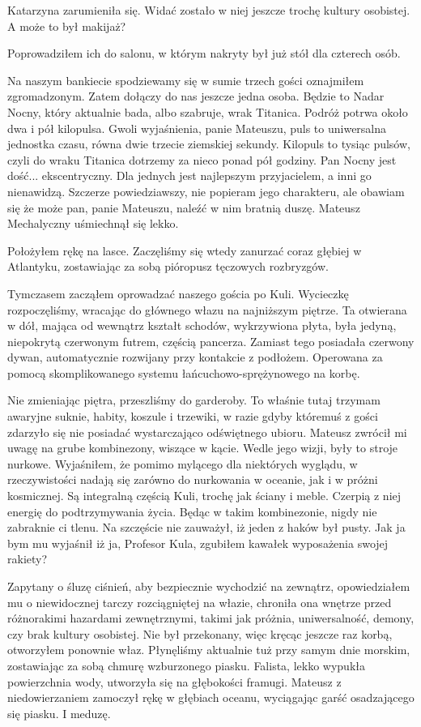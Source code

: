 Katarzyna zarumieniła się. Widać zostało w niej jeszcze trochę kultury osobistej. A może to był makijaż?

Poprowadziłem ich do salonu, w którym nakryty był już stół dla czterech osób.

\ds{} Na naszym bankiecie spodziewamy się w sumie trzech gości \dm{} oznajmiłem zgromadzonym. \dm{} Zatem dołączy do nas jeszcze jedna osoba.
Będzie to Nadar Nocny, który aktualnie bada, albo szabruje, wrak Titanica. Podróż potrwa około dwa i pół kilopulsa. 
Gwoli wyjaśnienia, panie Mateuszu, puls to uniwersalna jednostka czasu, równa dwie trzecie ziemskiej sekundy.
Kilopuls to tysiąc pulsów, czyli do wraku Titanica dotrzemy za nieco ponad pół godziny. 
Pan Nocny jest dość... ekscentryczny. Dla jednych jest najlepszym przyjacielem, a inni go nienawidzą.
Szczerze powiedziawszy, nie popieram jego charakteru, ale obawiam się że może pan, panie Mateuszu, naleźć w nim bratnią duszę.\dm{}
Mateusz Mechalyczny uśmiechnął się lekko. \de{}

Położyłem rękę na lasce.
Zaczęliśmy się wtedy zanurzać coraz głębiej w Atlantyku, zostawiając za sobą pióropusz tęczowych rozbryzgów.

Tymczasem zacząłem oprowadzać naszego gościa po Kuli.
Wycieczkę rozpoczęliśmy, wracając do głównego włazu na najniższym piętrze.
Ta otwierana w dół, mająca od wewnątrz kształt schodów, wykrzywiona płyta, była jedyną, niepokrytą czerwonym futrem, częścią pancerza.
Zamiast tego posiadała czerwony dywan, automatycznie rozwijany przy kontakcie z podłożem.
Operowana za pomocą skomplikowanego systemu łańcuchowo-sprężynowego na korbę.

Nie zmieniając piętra, przeszliśmy do garderoby.
To właśnie tutaj trzymam awaryjne suknie, habity, koszule i trzewiki, w razie gdyby któremuś z gości zdarzyło się nie posiadać wystarczająco odświętnego ubioru.
Mateusz zwrócił mi uwagę na grube kombinezony, wiszące w kącie. Wedle jego wizji, były to stroje nurkowe.
Wyjaśniłem, że pomimo mylącego dla niektórych wyglądu, w rzeczywistości nadają się zarówno do nurkowania w oceanie, jak i w próżni kosmicznej.
Są integralną częścią Kuli, trochę jak ściany i meble. Czerpią z niej energię do podtrzymywania życia. Będąc w takim kombinezonie, nigdy nie zabraknie ci tlenu.
Na szczęście nie zauważył, iż jeden z haków był pusty. Jak ja bym mu wyjaśnił iż ja, Profesor Kula, zgubiłem kawałek wyposażenia swojej rakiety?

Zapytany o śluzę ciśnień, aby bezpiecznie wychodzić na zewnątrz, opowiedziałem mu o niewidocznej tarczy rozciągniętej na włazie, chroniła ona wnętrze przed różnorakimi hazardami zewnętrznymi, takimi jak próżnia, uniwersalność, demony, czy brak kultury osobistej.
Nie był przekonany, więc kręcąc jeszcze raz korbą, otworzyłem ponownie właz. 
Płynęliśmy aktualnie tuż przy samym dnie morskim, zostawiając za sobą chmurę wzburzonego piasku.
Falista, lekko wypukła powierzchnia wody, utworzyła się na głębokości framugi. 
Mateusz z niedowierzaniem zamoczył rękę w głębiach oceanu, wyciągając garść osadzającego się piasku.
I meduzę.

